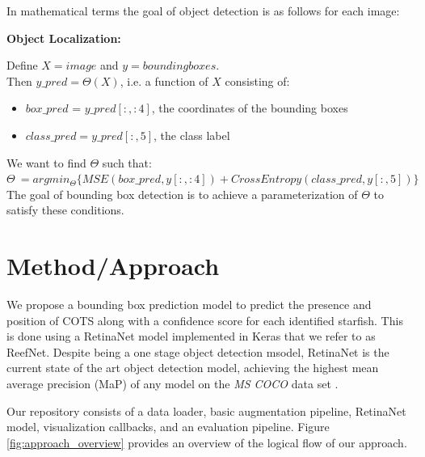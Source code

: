 \documentclass{article}
\begin{document}
In mathematical terms the goal of object detection is as follows for each image:

\textbf{Object Localization:}

Define $X=image$ and $y=bounding boxes$. \\
Then $y\_pred=\Theta(X)$, i.e. a function of $X$ consisting of: \\
\begin{itemize}
    \item  $box\_pred$ = $y\_pred[:, :4]$, the coordinates of the bounding boxes \\
    \item $class\_pred = y\_pred[:, 5]$, the class label \\
\end{itemize}

We want to find $\Theta$ such that: \\

$\Theta\ = argmin_{\Theta}\{MSE(box\_pred, y[:, :4]) + CrossEntropy(class\_pred, y[:, 5])\}$ \\

The goal of bounding box detection is to achieve a parameterization of $\Theta$ to satisfy these conditions.



\section{Method/Approach}
We propose a bounding box prediction model to predict the presence and position of COTS along with a confidence score for each identified starfish. This is done using a RetinaNet model implemented in Keras that we refer to as ReefNet. Despite being a one stage object detection msodel, RetinaNet is the current state of the art object detection model, achieving the highest mean average precision (MaP) of any model on the \textit{MS COCO} data set \cite{retinanet}\cite{coco}. 

Our repository consists of a data loader, basic augmentation pipeline, RetinaNet model, visualization callbacks, and an evaluation pipeline. Figure \ref{fig:approach_overview} provides an overview of the logical flow of our approach.
\end{document}
